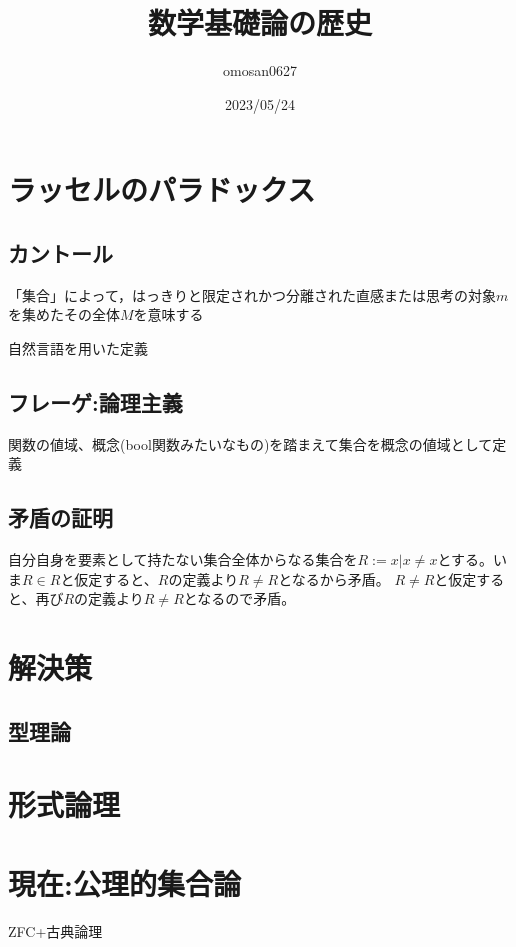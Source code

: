 \documentclass[a4paper,10pt]{article}
\title{数学基礎論の歴史}
\author{omosan0627}
\date{2023/05/24}
\begin{document}
\maketitle

\section{ラッセルのパラドックス}
\subsection{カントール}
\begin{center}
「集合」によって，はっきりと限定されかつ分離された直感または思考の対象$m$を集めたその全体$M$を意味する
\end{center}
自然言語を用いた定義
\subsection{フレーゲ:論理主義}
関数の値域、概念(bool関数みたいなもの)を踏まえて集合を概念の値域として定義
\subsection{矛盾の証明}
自分自身を要素として持たない集合全体からなる集合を$R:={x|x \neq x}$とする。いま$R\in R$と仮定すると、$R$の定義より$R\neq R$となるから矛盾。
$R\neq R$と仮定すると、再び$R$の定義より$R\neq R$となるので矛盾。

\section{解決策}
\subsection{型理論}
\section{形式論理}
\section{現在:公理的集合論}
ZFC+古典論理
\end{document}
